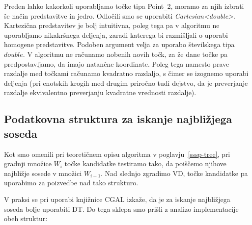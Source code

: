 \documentclass[a4paper, 12pt]{book}
\newcommand{\U}{\texttt{\_}}
\begin{document}
Preden lahko kakorkoli uporabljamo točke tipa Point\U 2, moramo za njih izbrati še način predstavitve in jedro. Odločili smo se uporabiti \textit{Cartesian<double>}. Kartezična predstavitev je bolj intuitivna, poleg tega pa v algoritmu ne uporabljamo nikakršnega deljenja, zaradi katerega bi razmišljali o uporabi homogene predstavitve. Podoben argument velja za uporabo številskega tipa $double$. V algoritmu ne računamo nobenih novih točk, za že dane točke pa predpostavljamo, da imajo natančne koordinate. Poleg tega namesto prave razdalje med točkami računamo kvadratno razdaljo, s čimer se izognemo uporabi deljenja (pri enotskih krogih med drugim priročno tudi dejstvo, da je preverjanje razdalje ekvivalentno preverjanju kvadratne vrednosti razdalje).

\subsection{Podatkovna struktura za iskanje najbližjega soseda}
\label{why dt}

Kot smo omenili pri teoretičnem opisu algoritma v poglavju~\ref{sssp-tree}, pri gradnji množice $W_i$ točke kandidatke testiramo tako, da poiščemo njihove najbližje sosede v množici $W_{i-1}$. Nad slednjo zgradimo VD, točke kandidatke pa uporabimo za poizvedbe nad tako strukturo.

V praksi se pri uporabi knjižnice CGAL izkaže, da je za iskanje najbližjega soseda bolje uporabiti DT. Do tega sklepa smo prišli z analizo implementacije obeh struktur:
\end{document}
